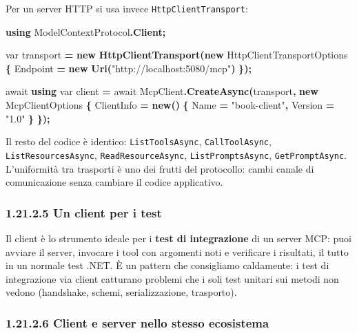 \documentclass[
  italian,
  10pt,
]{book}
\newenvironment{Shaded}{\begin{snugshade}}{\end{snugshade}}
\newcommand{\DataTypeTok}[1]{\textcolor[rgb]{0.13,0.29,0.53}{#1}}
\newcommand{\FunctionTok}[1]{\textcolor[rgb]{0.13,0.29,0.53}{\textbf{#1}}}
\newcommand{\KeywordTok}[1]{\textcolor[rgb]{0.13,0.29,0.53}{\textbf{#1}}}
\newcommand{\NormalTok}[1]{#1}
\newcommand{\OperatorTok}[1]{\textcolor[rgb]{0.81,0.36,0.00}{\textbf{#1}}}
\newcommand{\StringTok}[1]{\textcolor[rgb]{0.31,0.60,0.02}{#1}}
\begin{document}
Per un server HTTP si usa invece \texttt{HttpClientTransport}:

\begin{Shaded}
\begin{Highlighting}[]
\KeywordTok{using}\NormalTok{ ModelContextProtocol}\OperatorTok{.}\FunctionTok{Client}\OperatorTok{;}

\DataTypeTok{var}\NormalTok{ transport }\OperatorTok{=} \KeywordTok{new} \FunctionTok{HttpClientTransport}\OperatorTok{(}\KeywordTok{new}\NormalTok{ HttpClientTransportOptions}
\OperatorTok{\{}
\NormalTok{    Endpoint }\OperatorTok{=} \KeywordTok{new} \FunctionTok{Uri}\OperatorTok{(}\StringTok{"http://localhost:5080/mcp"}\OperatorTok{)}
\OperatorTok{\});}

\NormalTok{await }\KeywordTok{using} \DataTypeTok{var}\NormalTok{ client }\OperatorTok{=}\NormalTok{ await McpClient}\OperatorTok{.}\FunctionTok{CreateAsync}\OperatorTok{(}\NormalTok{transport}\OperatorTok{,} \KeywordTok{new}\NormalTok{ McpClientOptions}
\OperatorTok{\{}
\NormalTok{    ClientInfo }\OperatorTok{=} \KeywordTok{new}\OperatorTok{()} \OperatorTok{\{}\NormalTok{ Name }\OperatorTok{=} \StringTok{"book{-}client"}\OperatorTok{,}\NormalTok{ Version }\OperatorTok{=} \StringTok{"1.0"} \OperatorTok{\}}
\OperatorTok{\});}
\end{Highlighting}
\end{Shaded}

Il resto del codice è identico: \texttt{ListToolsAsync},
\texttt{CallToolAsync}, \texttt{ListResourcesAsync},
\texttt{ReadResourceAsync}, \texttt{ListPromptsAsync},
\texttt{GetPromptAsync}. L'uniformità tra trasporti è uno dei frutti del
protocollo: cambi canale di comunicazione senza cambiare il codice
applicativo.

\subsubsection{1.21.2.5 Un client per i
test}\label{un-client-per-i-test}

Il client è lo strumento ideale per i \textbf{test di integrazione} di
un server MCP: puoi avviare il server, invocare i tool con argomenti
noti e verificare i risultati, il tutto in un normale test .NET. È un
pattern che consigliamo caldamente: i test di integrazione via client
catturano problemi che i soli test unitari sui metodi non vedono
(handshake, schemi, serializzazione, trasporto).

\subsubsection{1.21.2.6 Client e server nello stesso
ecosistema}\label{client-e-server-nello-stesso-ecosistema}
\end{document}
